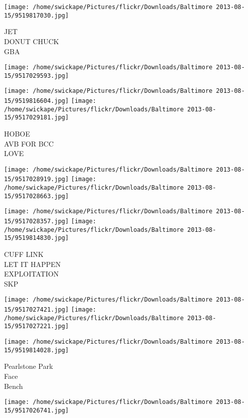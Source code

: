\documentclass[10pt,letterpaper]{article}
\begin{document}
\texttt{[image: /home/swickape/Pictures/flickr/Downloads/Baltimore 2013-08-15/9519817030.jpg]}

JET\\
DONUT CHUCK\\
GBA\\
\pagebreak

\texttt{[image: /home/swickape/Pictures/flickr/Downloads/Baltimore 2013-08-15/9517029593.jpg]}

\vspace{0.25in}
\texttt{[image: /home/swickape/Pictures/flickr/Downloads/Baltimore 2013-08-15/9519816604.jpg]}
\texttt{[image: /home/swickape/Pictures/flickr/Downloads/Baltimore 2013-08-15/9517029181.jpg]}

HOBOE\\
AVB FOR BCC\\
LOVE\\
\pagebreak

\texttt{[image: /home/swickape/Pictures/flickr/Downloads/Baltimore 2013-08-15/9517028919.jpg]}
\texttt{[image: /home/swickape/Pictures/flickr/Downloads/Baltimore 2013-08-15/9517028663.jpg]}

\texttt{[image: /home/swickape/Pictures/flickr/Downloads/Baltimore 2013-08-15/9517028357.jpg]}
\texttt{[image: /home/swickape/Pictures/flickr/Downloads/Baltimore 2013-08-15/9519814830.jpg]}

CUFF LINK\\
LET IT HAPPEN\\
EXPLOITATION\\
SKP\\
\pagebreak

\texttt{[image: /home/swickape/Pictures/flickr/Downloads/Baltimore 2013-08-15/9517027421.jpg]}
\texttt{[image: /home/swickape/Pictures/flickr/Downloads/Baltimore 2013-08-15/9517027221.jpg]}

\vspace{0.25in}
\texttt{[image: /home/swickape/Pictures/flickr/Downloads/Baltimore 2013-08-15/9519814028.jpg]}

Pearlstone Park\\
Face\\
Bench\\
\pagebreak

\texttt{[image: /home/swickape/Pictures/flickr/Downloads/Baltimore 2013-08-15/9517026741.jpg]}
\end{document}
